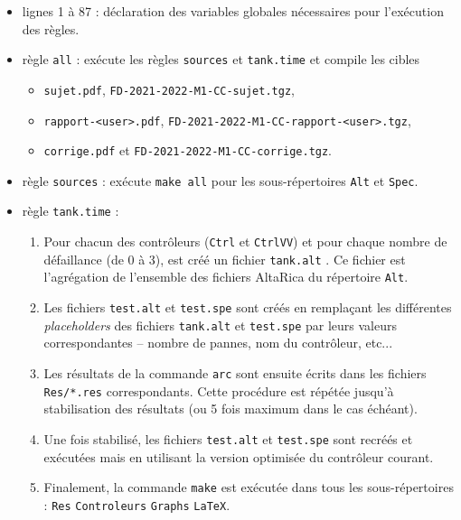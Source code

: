 \documentclass[a4paper]{book}
\begin{document}
\begin{itemize}
  \item lignes 1 à 87 : déclaration des variables globales nécessaires pour l'exécution des règles.
  \item règle \texttt{all} : exécute les règles \texttt{sources} et
    \texttt{tank.time} et compile les cibles
    \begin{itemize}
      \item \texttt{sujet.pdf}, \texttt{FD-2021-2022-M1-CC-sujet.tgz},
      \item \texttt{rapport-<user>.pdf}, \texttt{FD-2021-2022-M1-CC-rapport-<user>.tgz},
      \item \texttt{corrige.pdf} et \texttt{FD-2021-2022-M1-CC-corrige.tgz}.
    \end{itemize}
  \item règle \texttt{sources} : exécute \texttt{make all} pour les
    sous-répertoires \texttt{Alt} et \texttt{Spec}.
  \item règle \texttt{tank.time} :
      \begin{enumerate}
          \item Pour chacun des contrôleurs (\texttt{Ctrl} et \texttt{CtrlVV})
            et pour chaque nombre de défaillance (de 0 à 3), est
            créé un fichier \texttt{tank.alt} . Ce fichier est l'agrégation de
            l'ensemble des fichiers AltaRica du répertoire \texttt{Alt}.
          \item Les fichiers \texttt{test.alt} et \texttt{test.spe} sont créés
            en remplaçant les différentes \textit{placeholders} des fichiers
            \texttt{tank.alt} et \texttt{test.spe} par leurs valeurs
            correspondantes -- nombre de pannes, nom du contrôleur, etc...
          \item Les résultats de la commande \texttt{arc} sont ensuite écrits
            dans les fichiers \texttt{Res/*.res} correspondants.
            Cette procédure est répétée jusqu'à stabilisation des résultats (ou
            5 fois maximum dans le cas échéant).
          \item Une fois stabilisé, les fichiers \texttt{test.alt} et
            \texttt{test.spe} sont recréés et exécutées mais en utilisant la
            version optimisée du contrôleur courant.
          \item Finalement, la commande \texttt{make} est exécutée dans
            tous les sous-répertoires : \texttt{Res} \texttt{Controleurs}
            \texttt{Graphs} \texttt{LaTeX}.
      \end{enumerate}
\end{itemize}
\end{document}
